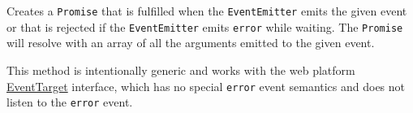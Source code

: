 Creates a \texttt{Promise} that is fulfilled when the
\texttt{EventEmitter} emits the given event or that is rejected if the
\texttt{EventEmitter} emits
\texttt{\textquotesingle{}error\textquotesingle{}} while waiting. The
\texttt{Promise} will resolve with an array of all the arguments emitted
to the given event.

This method is intentionally generic and works with the web platform
\href{https://dom.spec.whatwg.org/\#interface-eventtarget}{EventTarget}
interface, which has no special
\texttt{\textquotesingle{}error\textquotesingle{}} event semantics and
does not listen to the
\texttt{\textquotesingle{}error\textquotesingle{}} event.

\begin{Shaded}
\begin{Highlighting}[]
\OperatorTok{,} \NormalTok{ \} } \OperatorTok{;}
   \OperatorTok{;}

\OperatorTok{=}  \NormalTok{()}\OperatorTok{;}

\NormalTok{(() }\KeywordTok{=\textgreater{}}\NormalTok{ \{}
\NormalTok{(}\OperatorTok{,} \NormalTok{)}\OperatorTok{;}
\NormalTok{\})}\OperatorTok{;}

\NormalTok{ [value] }\OperatorTok{=}  \OperatorTok{,} \NormalTok{)}\OperatorTok{;}
\OperatorTok{;}

\OperatorTok{=}  \NormalTok{(}\NormalTok{)}\OperatorTok{;}
\NormalTok{(() }\KeywordTok{=\textgreater{}}\NormalTok{ \{}
\NormalTok{(}\OperatorTok{,}\OperatorTok{;}
\NormalTok{\})}\OperatorTok{;}

\NormalTok{ \{}
   \OperatorTok{,} \NormalTok{)}\OperatorTok{;}
\NormalTok{\} }
  \NormalTok{(}\OperatorTok{,}\OperatorTok{;}
\NormalTok{\}}
\end{Highlighting}
\end{Shaded}


